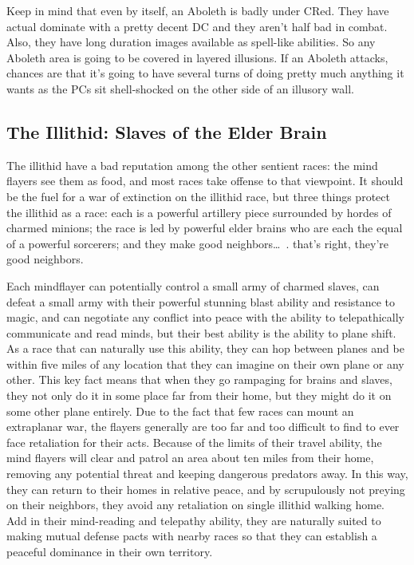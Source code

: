 Keep in mind that even by itself, an Aboleth is badly under CRed. They have actual dominate with a pretty decent DC and they aren't half bad in combat. Also, they have long duration images available as spell-like abilities. So any Aboleth area is going to be covered in layered illusions. If an Aboleth attacks, chances are that it's going to have several turns of doing pretty much anything it wants as the PCs sit shell-shocked on the other side of an illusory wall.

\subsection{The Illithid: Slaves of the Elder Brain}

The illithid have a bad reputation among the other sentient races: the mind flayers see them as food, and most races take offense to that viewpoint. It should be the fuel for a war of extinction on the illithid race, but three things protect the illithid as a race: each is a powerful artillery piece surrounded by hordes of charmed minions; the race is led by powerful elder brains who are each the equal of a powerful sorcerers; and they make good neighbors\ldots\ . that's right, they're good neighbors.

Each mindflayer can potentially control a small army of charmed slaves, can defeat a small army with their powerful stunning blast ability and resistance to magic, and can negotiate any conflict into peace with the ability to telepathically communicate and read minds, but their best ability is the ability to plane shift. As a race that can naturally use this ability, they can hop between planes and be within five miles of any location that they can imagine on their own plane or any other. This key fact means that when they go rampaging for brains and slaves, they not only do it in some place far from their home, but they might do it on some other plane entirely. Due to the fact that few races can mount an extraplanar war, the flayers generally are too far and too difficult to find to ever face retaliation for their acts. Because of the limits of their travel ability, the mind flayers will clear and patrol an area about ten miles from their home, removing any potential threat and keeping dangerous predators away. In this way, they can return to their homes in relative peace, and by scrupulously not preying on their neighbors, they avoid any retaliation on single illithid walking home. Add in their mind-reading and telepathy ability, they are naturally suited to making mutual defense pacts with nearby races so that they can establish a peaceful dominance in their own territory.

